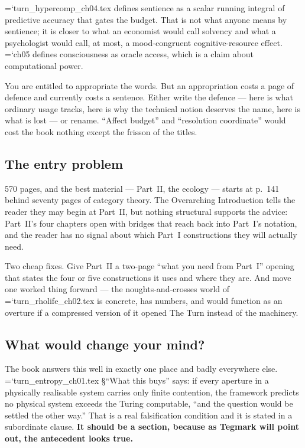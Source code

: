 \documentclass[11pt,letterpaper]{article}
\newcommand{\loc}[1]{{\small\ttfamily\color{accent}\hyphenchar\font=`\-\relax #1}}
\newcommand{\fnd}[1]{\textbf{\color{warn}#1}}
\begin{document}
\loc{turn\_hypercomp\_ch04.tex} defines sentience as a scalar running
integral of predictive accuracy that gates the budget. That is not
what anyone means by sentience; it is closer to what an economist
would call solvency and what a psychologist would call, at most, a
mood-congruent cognitive-resource effect. \loc{ch05} defines
consciousness as oracle access, which is a claim about computational
power.

You are entitled to appropriate the words. But an appropriation costs
a page of defence and currently costs a sentence. Either write the
defence --- here is what ordinary usage tracks, here is why the
technical notion deserves the name, here is what is lost --- or rename.
``Affect budget'' and ``resolution coordinate'' would cost the book
nothing except the frisson of the titles.

\subsection*{The entry problem}

570 pages, and the best material --- Part~II, the ecology --- starts at
p.~141 behind seventy pages of category theory. The Overarching
Introduction tells the reader they may begin at Part~II, but nothing
structural supports the advice: Part~II's four chapters open with
bridges that reach back into Part~I's notation, and the reader has no
signal about which Part~I constructions they will actually need.

Two cheap fixes. Give Part~II a two-page ``what you need from Part~I''
opening that states the four or five constructions it uses and where
they are. And move one worked thing forward --- the noughts-and-crosses
world of \loc{turn\_rholife\_ch02.tex} is concrete, has numbers, and
would function as an overture if a compressed version of it opened The
Turn instead of the machinery.

\subsection*{What would change your mind?}

The book answers this well in exactly one place and badly everywhere
else. \loc{turn\_entropy\_ch01.tex} \S``What this buys'' says: if every
aperture in a physically realisable system carries only finite
contention, the framework predicts no physical system exceeds the
Turing computable, ``and the question would be settled the other way.''
That is a real falsification condition and it is stated in a
subordinate clause. \fnd{It should be a section, because as Tegmark
will point out, the antecedent looks true.}
\end{document}
